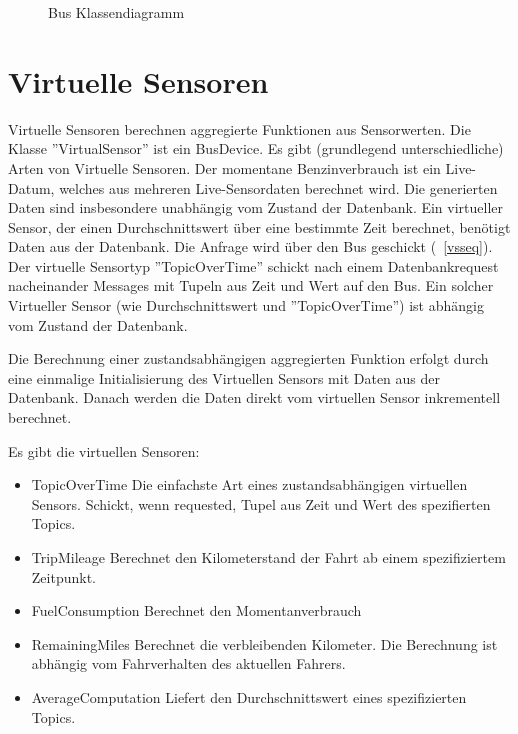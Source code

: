 \documentclass[entwurf.tex]{subfiles}
\begin{document}
  		\begin{figure}[H]
  			\begin{center}
  				\caption{Bus Klassendiagramm}
  			\end{center}
  		\end{figure}
  	
  	\newpage
  	\section{Virtuelle Sensoren}
		Virtuelle Sensoren berechnen aggregierte Funktionen aus Sensorwerten. Die Klasse ''VirtualSensor'' ist ein BusDevice. Es gibt (grundlegend unterschiedliche) Arten von Virtuelle Sensoren. Der momentane Benzinverbrauch ist ein Live-Datum, welches aus mehreren Live-Sensordaten berechnet wird. Die generierten Daten sind insbesondere unabhängig vom Zustand der Datenbank. Ein virtueller Sensor, der einen Durchschnittswert über eine bestimmte Zeit berechnet, benötigt Daten aus der Datenbank. Die Anfrage wird über den Bus geschickt (~\ref{vsseq}). Der virtuelle Sensortyp ''TopicOverTime'' schickt nach einem Datenbankrequest nacheinander Messages mit Tupeln aus Zeit und Wert auf den Bus. Ein solcher Virtueller Sensor (wie Durchschnittswert und ''TopicOverTime'') ist abhängig vom Zustand der Datenbank.

		Die Berechnung einer zustandsabhängigen aggregierten Funktion erfolgt durch eine einmalige Initialisierung des Virtuellen Sensors mit Daten aus der Datenbank. Danach werden die Daten direkt vom virtuellen Sensor inkrementell berechnet.

		Es gibt die virtuellen Sensoren:
		\begin{itemize}
			\item{TopicOverTime} Die einfachste Art eines zustandsabhängigen virtuellen Sensors. Schickt, wenn requested, Tupel aus Zeit und Wert des spezifierten Topics.
			\item{TripMileage} Berechnet den Kilometerstand der Fahrt ab einem spezifiziertem Zeitpunkt.
			\item{FuelConsumption} Berechnet den Momentanverbrauch
			\item{RemainingMiles} Berechnet die verbleibenden Kilometer. Die Berechnung ist abhängig vom Fahrverhalten des aktuellen Fahrers.
			\item{AverageComputation} Liefert den Durchschnittswert eines spezifizierten Topics.
		\end{itemize}
\end{document}
